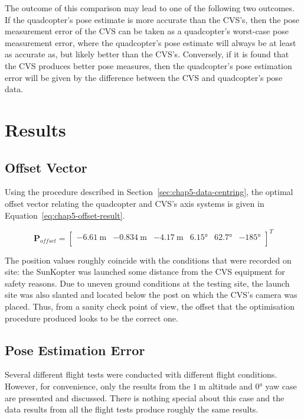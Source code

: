 The outcome of this comparison may lead to one of the following two outcomes. If the quadcopter's pose estimate is more accurate than the CVS's, then the pose measurement error of the CVS can be taken as a quadcopter's worst-case pose measurement error, where the quadcopter's pose estimate will always be at least as accurate as, but likely better than the CVS's. Conversely, if it is found that the CVS produces better pose measures, then the quadcopter's pose estimation error will be given by the difference between the CVS and quadcopter's pose data. 

\section{Results}

\subsection{Offset Vector}

Using the procedure described in Section~\ref{sec:chap5-data-centring}, the optimal offset vector relating the quadcopter and CVS's axis systems is given in Equation~\ref{eq:chap5-offset-result}. 

\begin{equation}
  \label{eq:chap5-offset-result}
  \bm{P}_{of\!fset} = 
  \begin{bmatrix}
    \SI{-6.61}{\m} & \SI{-0.834}{\m} & \SI{-4.17}{\m} & \ang{6.15} & \ang{62.7} & \ang{-185} \\
  \end{bmatrix}^T
\end{equation}

The position values roughly coincide with the conditions that were recorded on site: the SunKopter was launched some distance from the CVS equipment for safety reasons. Due to uneven ground conditions at the testing site, the launch site was also slanted and located below the post on which the CVS's camera was placed. Thus, from a sanity check point of view, the offset that the optimisation procedure produced looks to be the correct one. 

\subsection{Pose Estimation Error}

Several different flight tests were conducted with different flight conditions. However, for convenience, only the results from the $\SI{1}{\m}$ altitude and $\ang{0}$ yaw case are presented and discussed. There is nothing special about this case and the data results from all the flight tests produce roughly the same results.  

